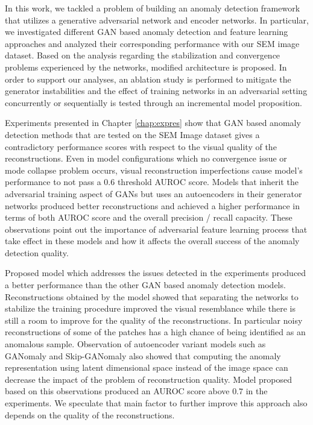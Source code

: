 
\begingroup
{ %
\color{Green}
	
In this work, we tackled a problem of building an anomaly detection framework that utilizes a 
generative adversarial network and encoder networks. In particular, we investigated different 
GAN based anomaly detection and feature learning approaches and analyzed their corresponding 
performance with our SEM image dataset. Based on the analysis regarding the stabilization and 
convergence problems experienced by the networks, modified architecture is proposed. In order to support 
our analyses, an ablation study is performed to mitigate the generator instabilities and the 
effect of training networks in an adversarial setting concurrently or sequentially is tested through 
an incremental model proposition.

Experiments presented in Chapter \ref{chap:expres} show that GAN based anomaly detection methods that 
are tested on the SEM Image dataset gives a contradictory performance scores with respect to the visual 
quality of the reconstructions. Even in model configurations which no convergence issue or mode collapse problem 
occurs, visual reconstruction imperfections cause model's performance to not pass a $0.6$ threshold AUROC score.
Models that inherit the adversarial training aspect of GANs but uses an autoencoders in 
their generator networks produced better reconstructions and achieved a higher performance in terms 
of both AUROC score and the overall precision / recall capacity. These observations point out the importance 
of adversarial feature learning process that take effect in these models and how it affects the overall success 
of the anomaly detection quality.

Proposed model which addresses the issues detected in the experiments produced a better performance 
than the other GAN based anomaly detection models. Reconstructions obtained by the model showed that 
separating the networks to stabilize the training procedure improved the visual resemblance while there 
is still a room to improve for the quality of the reconstructions. In particular noisy reconstructions of 
some of the patches has a high chance of being identified as an anomalous sample. Observation of autoencoder 
variant models such as GANomaly and Skip-GANomaly also showed that computing the anomaly representation using 
latent dimensional space instead of the image space can decrease the impact of the problem of reconstruction quality. 
Model proposed based on this observations produced an AUROC score above $0.7$ in the experiments. We speculate 
that main factor to further improve this approach also depends on the quality of the reconstructions.

}
